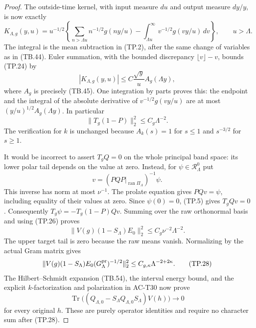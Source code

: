 \begin{proof}
The outside-time kernel, with input measure \(du\)
and output measure \(dy/y\), is now exactly
\[
 K_{\Lambda,g}(y,u)=u^{-1/2}
 \left\{\sum_{n>\Lambda u}n^{-1/2}g(ny/u)
       -\int_{\Lambda u}^{\infty}v^{-1/2}g(vy/u)\,dv
 \right\},\qquad u>\Lambda .
 \tag{TP.24}
\]
The integral is the mean subtraction in (TP.2), after
the same change of variables as in (TB.44).
Euler summation, with the bounded discrepancy
\(\lfloor v\rfloor-v\), bounds (TP.24) by
\[
       |K_{\Lambda,g}(y,u)|
          \leq C\frac{\sqrt y}{u}A_g(\Lambda y),
 \tag{TP.25}
\]
where \(A_g\) is precisely (TB.45).
One integration by parts proves this: the endpoint
and the integral of the absolute derivative of
\(v^{-1/2}g(vy/u)\) are at most
\((y/u)^{1/2}A_g(\Lambda y)\).
In particular
\[
                  \|T_g(1-P)\|_2^2\leq C_g\Lambda^{-2}.
 \tag{TP.26}
\]
The verification for \(k\) is unchanged because
\(A_k(s)=1\) for \(s\leq1\) and \(s^{-3/2}\) for
\(s\geq1\).

It would be incorrect to assert \(T_gQ=0\) on the
whole principal band space: its lower polar tail
depends on the value at zero.
Instead, for \(\psi\in\mathcal R_\Lambda^0\) put
\[
 v=(PQP|_{\operatorname{ran}\Pi_\Lambda})^{-1}\psi .
\]
This inverse has norm at most \(\nu^{-1}\).
The prolate equation gives \(PQv=\psi\), including
equality of their values at zero.
Since \(\psi(0)=0\), (TP.5) gives \(T_gQv=0\).
Consequently \(T_g\psi=-T_g(1-P)Qv\).
Summing over the raw orthonormal basis and using
(TP.26) proves
\[
 \|V(g)(1-S_\Lambda)E_0\|_2^2
                         \leq C_g\nu^{-2}\Lambda^{-2}.
 \tag{TP.27}
\]
The upper target tail is zero because the raw means
vanish.  Normalizing by the actual Gram matrix gives
\[
 \|V(g)(1-S_\Lambda)E_0(G_\Lambda^{\rm pr})^{-1/2}\|_2^2
                  \leq C_{g,\kappa}\Lambda^{-2+2\kappa}.
 \tag{TP.28}
\]
The Hilbert--Schmidt expansion (TB.54), the interval
energy bound, and the explicit \(k\)-factorization
and polarization in AC-T30 now prove
\[
 \operatorname{Tr}\bigl((Q_{\Lambda,0}
          -S_\Lambda Q_{\Lambda,0}S_\Lambda)V(h)\bigr)
                                      \longrightarrow0
 \tag{TP.29}
\]
for every original \(h\).  These are purely
operator identities and require no character sum
after (TP.28).


\end{proof}
